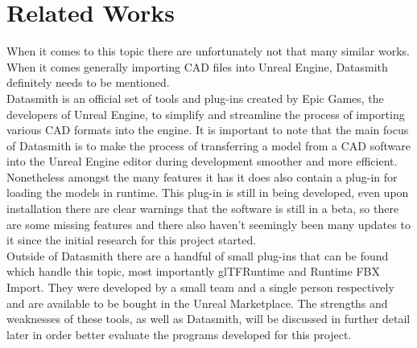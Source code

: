\section{Related Works}

When it comes to this topic there are unfortunately not that many similar works. When it comes generally importing CAD files into Unreal Engine, Datasmith definitely needs to be mentioned.\\ Datasmith is an official set of tools and plug-ins created by Epic Games, the developers of Unreal Engine, to simplify and streamline the process of importing various CAD formats into the engine\cite{}. It is important to note that the main focus of Datasmith is to make the process of transferring a model from a CAD software into the Unreal Engine editor during development smoother and more efficient\cite{}. Nonetheless amongst the many features it has it does also contain a plug-in for loading the models in runtime. This plug-in is still in being developed, even upon installation there are clear warnings that the software is still in a beta, so there are some missing features and there also haven't seemingly been many updates to it since the initial research for this project started\cite{}.\\
Outside of Datasmith there are a handful of small plug-ins that can be found which handle this topic, most importantly glTFRuntime\cite{} and Runtime FBX Import\cite{}. They were developed by a small team and a single person respectively and are available to be bought in the Unreal Marketplace. The strengths and weaknesses of these tools, as well as Datasmith, will be discussed in further detail later in order better evaluate the programs developed for this project.